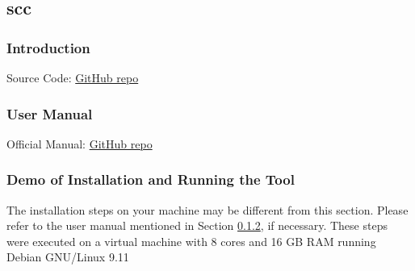 \documentclass[letterpaper,cleveref]{lipics-v2019}
\begin{document}
\subsection{scc}

\subsubsection{Introduction}

Source Code: \href{https://github.com/boyter/scc}{GitHub repo}

\subsubsection{User Manual} \label{scc_manual}

Official Manual: \href{https://github.com/boyter/scc}{GitHub repo}

\subsubsection{Demo of Installation and Running the Tool}

The installation steps on your machine may be different from this section.
Please refer to the user manual mentioned in Section \ref{scc_manual}, if
necessary.  These steps were executed on a virtual machine with 8 cores and 16
GB RAM running Debian GNU/Linux 9.11
\end{document}
